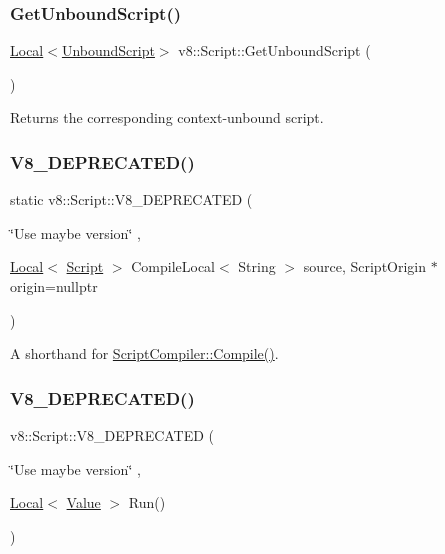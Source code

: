 \subsubsection{\texorpdfstring{Get\+Unbound\+Script()}{GetUnboundScript()}}
{\footnotesize\ttfamily \mbox{\hyperlink{classv8_1_1Local}{Local}}$<$\mbox{\hyperlink{classv8_1_1UnboundScript}{Unbound\+Script}}$>$ v8\+::\+Script\+::\+Get\+Unbound\+Script (\begin{DoxyParamCaption}{ }\end{DoxyParamCaption})}

Returns the corresponding context-\/unbound script. \mbox{\label{classv8_1_1Script_a04d2ee2ca108f663cf32b32b87ae519c}} 
\subsubsection{\texorpdfstring{V8\+\_\+\+D\+E\+P\+R\+E\+C\+A\+T\+E\+D()}{V8\_DEPRECATED()}\hspace{0.1cm}{\footnotesize\ttfamily [1/2]}}
{\footnotesize\ttfamily static v8\+::\+Script\+::\+V8\+\_\+\+D\+E\+P\+R\+E\+C\+A\+T\+ED (\begin{DoxyParamCaption}\item[{\char`\"{}Use maybe version\char`\"{}}]{,  }\item[{\mbox{\hyperlink{classv8_1_1Local}{Local}}$<$ \mbox{\hyperlink{classv8_1_1Script}{Script}} $>$ }]{CompileLocal$<$ String $>$ source, Script\+Origin $\ast$origin=nullptr }\end{DoxyParamCaption})\hspace{0.3cm}{\ttfamily [static]}}

A shorthand for \mbox{\hyperlink{classv8_1_1ScriptCompiler_a217bcf520f4ed70f6f02afeabfe60319}{Script\+Compiler\+::\+Compile()}}. \mbox{\label{classv8_1_1Script_a4b52dd4dc71d2290095195414f6219d0}} 
\subsubsection{\texorpdfstring{V8\+\_\+\+D\+E\+P\+R\+E\+C\+A\+T\+E\+D()}{V8\_DEPRECATED()}\hspace{0.1cm}{\footnotesize\ttfamily [2/2]}}
{\footnotesize\ttfamily v8\+::\+Script\+::\+V8\+\_\+\+D\+E\+P\+R\+E\+C\+A\+T\+ED (\begin{DoxyParamCaption}\item[{\char`\"{}Use maybe version\char`\"{}}]{,  }\item[{\mbox{\hyperlink{classv8_1_1Local}{Local}}$<$ \mbox{\hyperlink{classv8_1_1Value}{Value}} $>$ }]{Run() }\end{DoxyParamCaption})}

